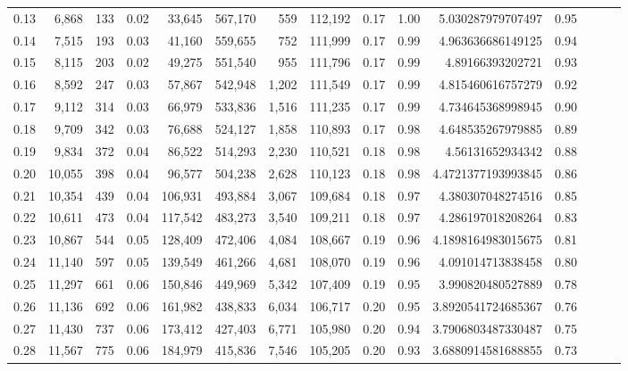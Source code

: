 \begin{tabular}{rrrrrrrrrrrrrrr}
0.13 &   6,868 &    133 &  0.02 &   33,645 &  567,170 &      559 &  112,192 &  0.17 &  1.00 &      5.030287979707497 &      0.95 \\
0.14 &   7,515 &    193 &  0.03 &   41,160 &  559,655 &      752 &  111,999 &  0.17 &  0.99 &      4.963636686149125 &      0.94 \\
0.15 &   8,115 &    203 &  0.02 &   49,275 &  551,540 &      955 &  111,796 &  0.17 &  0.99 &       4.89166393202721 &      0.93 \\
0.16 &   8,592 &    247 &  0.03 &   57,867 &  542,948 &    1,202 &  111,549 &  0.17 &  0.99 &      4.815460616757279 &      0.92 \\
0.17 &   9,112 &    314 &  0.03 &   66,979 &  533,836 &    1,516 &  111,235 &  0.17 &  0.99 &      4.734645368998945 &      0.90 \\
0.18 &   9,709 &    342 &  0.03 &   76,688 &  524,127 &    1,858 &  110,893 &  0.17 &  0.98 &      4.648535267979885 &      0.89 \\
0.19 &   9,834 &    372 &  0.04 &   86,522 &  514,293 &    2,230 &  110,521 &  0.18 &  0.98 &       4.56131652934342 &      0.88 \\
0.20 &  10,055 &    398 &  0.04 &   96,577 &  504,238 &    2,628 &  110,123 &  0.18 &  0.98 &     4.4721377193993845 &      0.86 \\
0.21 &  10,354 &    439 &  0.04 &  106,931 &  493,884 &    3,067 &  109,684 &  0.18 &  0.97 &      4.380307048274516 &      0.85 \\
0.22 &  10,611 &    473 &  0.04 &  117,542 &  483,273 &    3,540 &  109,211 &  0.18 &  0.97 &      4.286197018208264 &      0.83 \\
0.23 &  10,867 &    544 &  0.05 &  128,409 &  472,406 &    4,084 &  108,667 &  0.19 &  0.96 &     4.1898164983015675 &      0.81 \\
0.24 &  11,140 &    597 &  0.05 &  139,549 &  461,266 &    4,681 &  108,070 &  0.19 &  0.96 &      4.091014713838458 &      0.80 \\
0.25 &  11,297 &    661 &  0.06 &  150,846 &  449,969 &    5,342 &  107,409 &  0.19 &  0.95 &      3.990820480527889 &      0.78 \\
0.26 &  11,136 &    692 &  0.06 &  161,982 &  438,833 &    6,034 &  106,717 &  0.20 &  0.95 &     3.8920541724685367 &      0.76 \\
0.27 &  11,430 &    737 &  0.06 &  173,412 &  427,403 &    6,771 &  105,980 &  0.20 &  0.94 &     3.7906803487330487 &      0.75 \\
0.28 &  11,567 &    775 &  0.06 &  184,979 &  415,836 &    7,546 &  105,205 &  0.20 &  0.93 &     3.6880914581688855 &      0.73 \\

\end{tabular}
